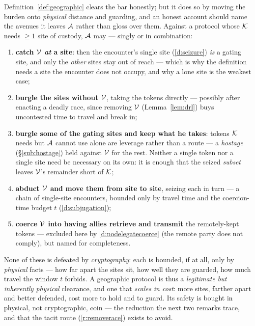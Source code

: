 \begin{remark}\label{rem:geographic-cost}
Definition~\ref{def:geographic} clears the bar honestly; but it does so by moving
the burden onto \emph{physical} distance and guarding, and an honest account should
name the avenues it leaves $\mathcal{A}$ rather than gloss over them. Against a
protocol whose $\mathcal{K}$ needs $\ge 1$ site of custody, $\mathcal{A}$ may --- singly or in
combination:
\begin{enumerate}[nosep,leftmargin=1.9em]
  \item \textbf{catch $\mathcal{V}$ \emph{at} a site}: then the encounter's single site
        (\ref{d:seizure}) \emph{is} a gating site, and only the \emph{other} sites
        stay out of reach --- which is why the definition needs a site the encounter
        does not occupy, and why a lone site is the weakest case;
  \item \textbf{burgle the sites without $\mathcal{V}$}, taking the tokens directly ---
        possibly after enacting a deadly race, since removing $\mathcal{V}$
        (Lemma~\ref{lem:drl}) buys uncontested time to travel and break in;
  \item \textbf{burgle some of the gating sites and keep what he takes}: tokens
        $\mathcal{K}$ needs but $\mathcal{A}$ cannot use alone are leverage rather than a
        route --- a \emph{hostage} (\S\ref{sub:hostage}) held against $\mathcal{V}$ for
        the rest. Neither a single token nor a single site need be necessary on its
        own: it is enough that the seized \emph{subset} leaves $\mathcal{V}$'s remainder
        short of $\mathcal{K}$;
  \item \textbf{abduct $\mathcal{V}$ and move them from site to site}, seizing each in
        turn --- a chain of single-site encounters, bounded only by travel time and
        the coercion-time budget $t$ (\ref{d:subjugation});
  \item \textbf{coerce $\mathcal{V}$ into having allies retrieve and transmit} the
        remotely-kept tokens --- excluded here by \ref{d:nodelegatecoerce}
        (the remote party does not comply), but named for completeness.
\end{enumerate}
None of these is defeated by \emph{cryptography}: each is bounded, if at all, only
by \emph{physical} facts --- how far apart the sites sit, how well they are guarded,
how much travel the window $t$ forbids. A geographic protocol is thus a
\emph{legitimate but inherently physical} clearance, and one that \emph{scales in
cost}: more sites, farther apart and better defended, cost more to hold and to
guard. Its safety is bought in physical, not cryptographic, coin --- the reduction
the next two remarks trace, and that the tacit route (\ref{r:removerace}) exists to
avoid.
\end{remark}

